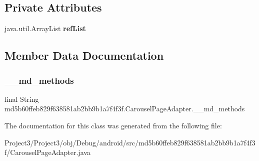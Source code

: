 \subsection*{Private Attributes}
\begin{DoxyCompactItemize}
\item 
\mbox{\label{classmd5b60ffeb829f638581ab2bb9b1a7f4f3f_1_1CarouselPageAdapter_aa22f5798ddaa23eeeb67082001d53a19}} 
java.\+util.\+Array\+List {\bfseries ref\+List}
\end{DoxyCompactItemize}


\subsection{Member Data Documentation}
\mbox{\label{classmd5b60ffeb829f638581ab2bb9b1a7f4f3f_1_1CarouselPageAdapter_aaf2a268eb1b8b79578e2ee7590f20521}} 
\subsubsection{\texorpdfstring{\+\_\+\+\_\+md\+\_\+methods}{\_\_md\_methods}}
{\footnotesize\ttfamily final String md5b60ffeb829f638581ab2bb9b1a7f4f3f.\+Carousel\+Page\+Adapter.\+\_\+\+\_\+md\+\_\+methods\hspace{0.3cm}{\ttfamily [static]}}



The documentation for this class was generated from the following file\+:\begin{DoxyCompactItemize}
\item 
Project3/\+Project3/obj/\+Debug/android/src/md5b60ffeb829f638581ab2bb9b1a7f4f3f/Carousel\+Page\+Adapter.\+java\end{DoxyCompactItemize}
